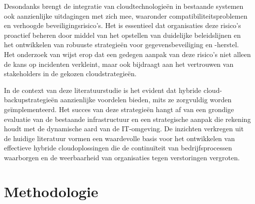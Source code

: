 Desondanks brengt de integratie van cloudtechnologieën in bestaande systemen ook aanzienlijke uitdagingen met zich mee, waaronder compatibiliteitsproblemen en verhoogde beveiligingsrisico's. Het is essentieel dat organisaties deze risico's proactief beheren door middel van het opstellen van duidelijke beleidslijnen en het ontwikkelen van robuuste strategieën voor gegevensbeveiliging en -herstel. Het onderzoek van \textcite{Yanamala2024} wijst erop dat een gedegen aanpak van deze risico's niet alleen de kans op incidenten verkleint, maar ook bijdraagt aan het vertrouwen van stakeholders in de gekozen cloudstrategieën.

In de context van deze literatuurstudie is het evident dat hybride cloud-backupstrategieën aanzienlijke voordelen bieden, mits ze zorgvuldig worden geïmplementeerd. Het succes van deze strategieën hangt af van een grondige evaluatie van de bestaande infrastructuur en een strategische aanpak die rekening houdt met de dynamische aard van de IT-omgeving. De inzichten verkregen uit de huidige literatuur vormen een waardevolle basis voor het ontwikkelen van effectieve hybride cloudoplossingen die de continuïteit van bedrijfsprocessen waarborgen en de weerbaarheid van organisaties tegen verstoringen vergroten.


\section{Methodologie}%
\label{sec:methodologie}




